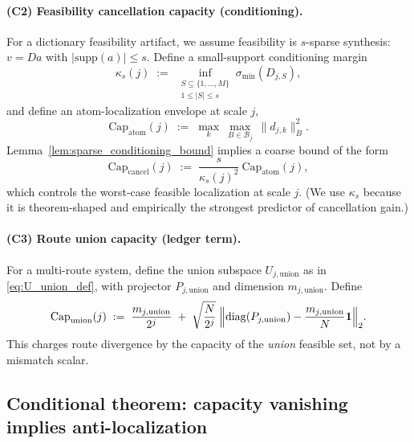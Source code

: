\documentclass[11pt]{article}
\theoremstyle{plain}
\theoremstyle{definition}
\theoremstyle{remark}
\begin{document}
\paragraph{(C2) Feasibility cancellation capacity (conditioning).}
For a dictionary feasibility artifact, we assume feasibility is \(s\)-sparse synthesis:
\(v=D a\) with \(|\mathrm{supp}(a)|\le s\).
Define a small-support conditioning margin
\begin{equation}\label{eq:kappa_s_def}
\kappa_s(j)
\;:=\;
\inf_{\substack{S\subseteq\{1,\dots,M\}\\1\le |S|\le s}}\sigma_{\min}(D_{j,S}),
\end{equation}
and define an atom-localization envelope at scale \(j\),
\begin{equation}\label{eq:Cap_atom_def}
\mathrm{Cap}_{\mathrm{atom}}(j)
\;:=\;
\max_{k}\ \max_{B\in\mathcal{B}_j}\ \|d_{j,k}\|_B^2.
\end{equation}
Lemma~\ref{lem:sparse_conditioning_bound} implies a coarse bound of the form
\begin{equation}\label{eq:Cap_cancel_def}
\mathrm{Cap}_{\mathrm{cancel}}(j)
\;:=\;
\frac{s}{\kappa_s(j)^2}\ \mathrm{Cap}_{\mathrm{atom}}(j),
\end{equation}
which controls the worst-case feasible localization at scale \(j\).
(We use \(\kappa_s\) because it is theorem-shaped and empirically the strongest predictor of cancellation gain.)

\paragraph{(C3) Route union capacity (ledger term).}
For a multi-route system, define the union subspace \(U_{j,\mathrm{union}}\) as in \eqref{eq:U_union_def}, with projector \(P_{j,\mathrm{union}}\) and dimension \(m_{j,\mathrm{union}}\).
Define
\begin{equation}\label{eq:Cap_union_def}
\mathrm{Cap}_{\mathrm{union}}(j)
\;:=\;
\frac{m_{j,\mathrm{union}}}{2^j}
\;+\;
\sqrt{\frac{N}{2^j}}\;\Bigl\|\mathrm{diag}(P_{j,\mathrm{union}})-\frac{m_{j,\mathrm{union}}}{N}\mathbf{1}\Bigr\|_2.
\end{equation}
This charges route divergence by the capacity of the \emph{union} feasible set, not by a mismatch scalar.

\subsection{Conditional theorem: capacity vanishing implies anti-localization}\label{subsec:capacity_implies_AL}
\end{document}
